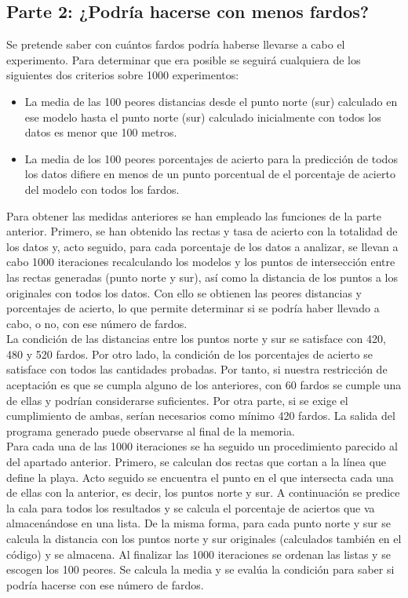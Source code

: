 \documentclass{article}
\begin{document}
\subsection{Parte 2: ¿Podría hacerse con menos fardos?}

Se pretende saber con cuántos fardos podría haberse llevarse a cabo el experimento. Para determinar que era posible se seguirá cualquiera de los siguientes dos criterios sobre 1000 experimentos:
\begin{itemize}
    \item La media de las 100 peores distancias desde el punto norte (sur) calculado en ese modelo hasta el punto norte (sur) calculado inicialmente con todos los datos es menor que 100 metros.
    \item La media de los 100 peores porcentajes de acierto para la predicción de todos los datos difiere en menos de un punto porcentual de el porcentaje de acierto del modelo con todos los fardos.
\end{itemize}

Para obtener las medidas anteriores se han empleado las funciones de la parte anterior. Primero, se han obtenido las rectas y tasa de acierto con la totalidad de los datos y, acto seguido, para cada porcentaje de los datos a analizar, se llevan a cabo 1000 iteraciones recalculando los modelos y los puntos de intersección entre las rectas generadas (punto norte y sur), así como la distancia de los puntos a los originales con todos los datos. Con ello se obtienen las peores distancias y porcentajes de acierto, lo que permite determinar si se podría haber llevado a cabo, o no, con ese número de fardos.\\
La condición de las distancias entre los puntos norte y sur se satisface con 420, 480 y 520 fardos. Por otro lado, la condición de los porcentajes de acierto se satisface con todos las cantidades probadas. Por tanto, si nuestra restricción de aceptación es que se cumpla alguno de los anteriores, con 60 fardos se cumple una de ellas y podrían considerarse suficientes. Por otra parte, si se exige el cumplimiento de ambas, serían necesarios como mínimo 420 fardos. La salida del programa generado puede observarse al final de la memoria.\\

Para cada una de las 1000 iteraciones se ha seguido un procedimiento parecido al del apartado anterior. Primero, se calculan dos rectas que cortan a la línea que define la playa. Acto seguido se encuentra el punto en el que intersecta cada una de ellas con la anterior, es decir, los puntos norte y sur. A continuación se predice la cala para todos los resultados y se calcula el porcentaje de aciertos que va almacenándose en una lista. De la misma forma, para cada punto norte y sur se calcula la distancia con los puntos norte y sur originales (calculados también en el código) y se almacena. Al finalizar las 1000 iteraciones se ordenan las listas y se escogen los 100 peores. Se calcula la media y se evalúa la condición para saber si podría hacerse con ese número de fardos.\\
\end{document}

